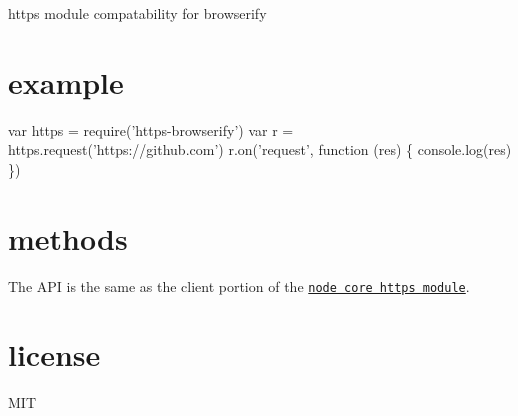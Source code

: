 https module compatability for browserify

\section*{example}


\begin{DoxyCode}
var https = require('https-browserify')
var r = https.request('https://github.com')
r.on('request', function (res) \{
  console.log(res)
\})
\end{DoxyCode}


\section*{methods}

The A\+PI is the same as the client portion of the \href{http://nodejs.org/docs/latest/api/https.html}{\tt node core https module}.

\section*{license}

M\+IT 